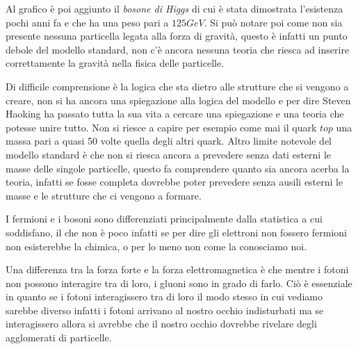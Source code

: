 Al grafico è poi aggiunto il \emph{bosone di Higgs} di cui è stata dimostrata l'esistenza pochi anni fa e che ha una peso pari a $125GeV$.
Si può notare poi come non sia presente nessuna particella legata alla forza di gravità, questo è infatti un punto debole del modello standard, non c'è ancora nessuna teoria che riesca ad inserire correttamente la gravità nella fisica delle particelle.

Di difficile comprensione è la logica che sta dietro alle strutture che si vengono a creare, non si ha ancora una spiegazione alla logica del modello e per dire Steven Haoking ha passato tutta la sua vita a cercare una spiegazione e una teoria che potesse unire tutto.
Non si riesce a capire per esempio come mai il quark $top$ una massa pari a quasi 50 volte quella degli altri quark. 
Altro limite notevole del modello standard è che non si riesca ancora a prevedere senza dati esterni le masse delle singole particelle, questo fa comprendere quanto sia ancora acerba la teoria, infatti se fosse completa dovrebbe poter prevedere senza ausili esterni le masse e le strutture che ci vengono a formare.

I fermioni e i bosoni sono differenziati principalmente dalla statistica a cui soddisfano, il che non è poco infatti se per dire gli elettroni non fossero fermioni non esisterebbe la chimica, o per lo meno non come la conosciamo noi.

Una differenza tra la forza forte e la forza elettromagnetica è che mentre i fotoni non possono interagire tra di loro, i gluoni sono in grado di farlo.
Ciò è essenziale in quanto se i fotoni interagissero tra di loro il modo stesso in cui vediamo sarebbe diverso infatti i fotoni arrivano al nostro occhio indisturbati ma se interagissero allora si avrebbe che il nostro occhio dovrebbe rivelare degli agglomerati di particelle.

